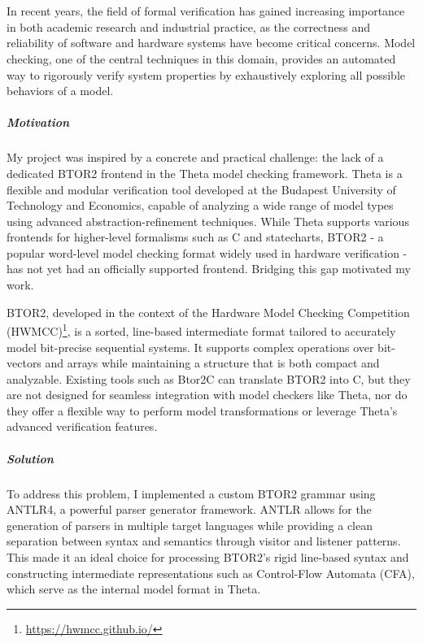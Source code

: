 \chapter{\bevezetes}

In recent years, the field of formal verification has gained increasing importance in both academic research and industrial practice, as the correctness and reliability of software and hardware systems have become critical concerns. Model checking, one of the central techniques in this domain, provides an automated way to rigorously verify system properties by exhaustively exploring all possible behaviors of a model.~\cite{modelChecking}\cite{systemEngineering}

\paragraph{Motivation} My project was inspired by a concrete and practical challenge: the lack of a dedicated BTOR2 frontend in the Theta model checking framework. Theta is a flexible and modular verification tool developed at the Budapest University of Technology and Economics, capable of analyzing a wide range of model types using advanced abstraction-refinement techniques. While Theta supports various frontends for higher-level formalisms such as C and statecharts, BTOR2 - a popular word-level model checking format widely used in hardware verification - has not yet had an officially supported frontend. Bridging this gap motivated my work.~\cite{btor2}\cite{theta}

BTOR2, developed in the context of the Hardware Model Checking Competition (HWMCC)\footnote{\url{https://hwmcc.github.io/}}, is a sorted, line-based intermediate format tailored to accurately model bit-precise sequential systems. It supports complex operations over bit-vectors and arrays while maintaining a structure that is both compact and analyzable. Existing tools such as Btor2C can translate BTOR2 into C, but they are not designed for seamless integration with model checkers like Theta, nor do they offer a flexible way to perform model transformations or leverage Theta's advanced verification features.~\cite{btor2c}

\paragraph{Solution} To address this problem, I implemented a custom BTOR2 grammar using ANTLR4, a powerful parser generator framework. ANTLR allows for the generation of parsers in multiple target languages while providing a clean separation between syntax and semantics through visitor and listener patterns. This made it an ideal choice for processing BTOR2's rigid line-based syntax and constructing intermediate representations such as Control-Flow Automata (CFA), which serve as the internal model format in Theta.\cite{cfa}

